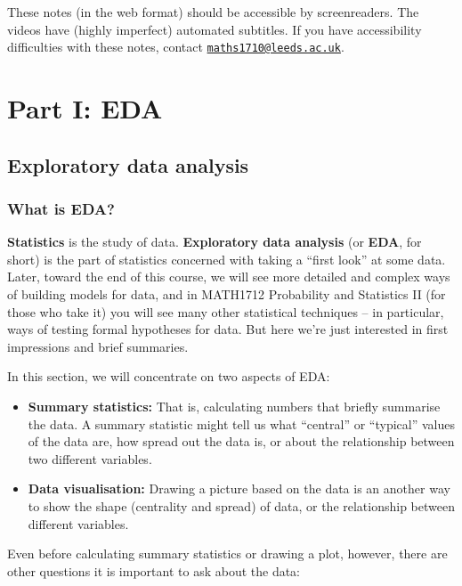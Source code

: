 \documentclass[
  a4paper,
]{book}
\providecommand{\tightlist}{%
  \setlength{\itemsep}{0pt}\setlength{\parskip}{0pt}}
\theoremstyle{definition}
\theoremstyle{definition}
\theoremstyle{definition}
\theoremstyle{definition}
\theoremstyle{remark}
\begin{document}
These notes (in the web format) should be accessible by screenreaders. The videos have (highly imperfect) automated subtitles. If you have accessibility difficulties with these notes, contact \href{mailto:maths1710@leeds.ac.uk}{\nolinkurl{maths1710@leeds.ac.uk}}.

\hypertarget{part-part-i-eda}{%
\part*{Part I: EDA}\label{part-part-i-eda}}

\hypertarget{S01-eda}{%
\chapter{Exploratory data analysis}\label{S01-eda}}

\hypertarget{what-is-eda}{%
\section{What is EDA?}\label{what-is-eda}}

\textbf{Statistics} is the study of data. \textbf{Exploratory data analysis} (or \textbf{EDA}, for short) is the part of statistics concerned with taking a ``first look'' at some data. Later, toward the end of this course, we will see more detailed and complex ways of building models for data, and in MATH1712 Probability and Statistics II (for those who take it) you will see many other statistical techniques -- in particular, ways of testing formal hypotheses for data. But here we're just interested in first impressions and brief summaries.

In this section, we will concentrate on two aspects of EDA:

\begin{itemize}
\tightlist
\item
  \textbf{Summary statistics:} That is, calculating numbers that briefly summarise the data. A summary statistic might tell us what ``central'' or ``typical'' values of the data are, how spread out the data is, or about the relationship between two different variables.
\item
  \textbf{Data visualisation:} Drawing a picture based on the data is an another way to show the shape (centrality and spread) of data, or the relationship between different variables.
\end{itemize}

Even before calculating summary statistics or drawing a plot, however, there are other questions it is important to ask about the data:
\end{document}
